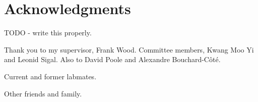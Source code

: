 
\chapter{Acknowledgments}

TODO - write this properly.

Thank you to my supervisor, Frank Wood. Committee members, Kwang Moo Yi and Leonid Sigal. Also to David Poole and Alexandre Bouchard-Côté.

Current and former labmates.

Other friends and family.
